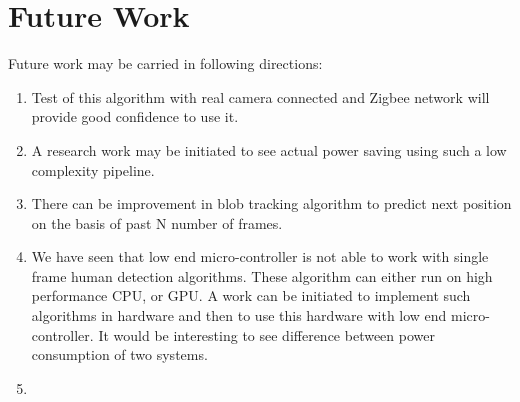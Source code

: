 
\chapter{Future Work} %
\label{Chapter2}
Future work may be carried in following directions:
\begin{enumerate}
\item Test of this algorithm with real camera connected and Zigbee
network will provide good confidence to use it.
\item A research work may be initiated to see actual power saving using
such a low complexity pipeline.
\item There can be improvement in blob tracking algorithm to predict
next position on the basis of past N number of frames.
\item We have seen that low end micro-controller is not able to work with
single frame human detection algorithms. These algorithm can either run on
high performance CPU, or GPU. A work can be initiated to implement such
algorithms in hardware and then to use this hardware with low end
micro-controller. It would be interesting to see difference between power
consumption of two systems.
\item 
\end{enumerate}



